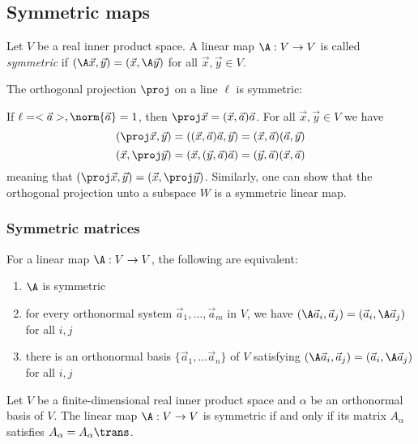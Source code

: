 \subsection{Symmetric maps}
\begin{definition}
    Let $V$ be a real inner product space. A linear map $\A: V \to V$ is called \emph{symmetric} if $(\A\vec{x},\vec{y}) = (\vec{x},\A\vec{y})$
    for all $\vec{x},\vec{y} \in V$.
\end{definition}
\begin{example}
    The orthogonal projection $\proj$ on a line $\ell$ is symmetric:

    If $\ell = <\vec{a}>, \norm{\vec{a}} = 1$, then $\proj\vec{x} = (\vec{x},\vec{a})\vec{a}$.
    For all $\vec{x},\vec{y} \in V$ we have
    $$(\proj\vec{x},\vec{y})=((\vec{x},\vec{a})\vec{a},\vec{y})=(\vec{x},\vec{a})(\vec{a},\vec{y})$$
    $$(\vec{x},\proj\vec{y})=(\vec{x},(\vec{y},\vec{a})\vec{a})=(\vec{y},\vec{a})(\vec{x},\vec{a})$$
    meaning that $(\proj\vec{x},\vec{y}) = (\vec{x},\proj\vec{y})$.
    Similarly, one can show that the orthogonal projection unto a subspace $W$ is a symmetric linear map.
\end{example}

\subsubsection{Symmetric matrices}
\begin{theorem}
    For a linear map $\A: V \to V$, the following are equivalent:
    \begin{enumerate}
        \item $\A$ is symmetric
        \item for every orthonormal system $\vec{a}_1, \dots, \vec{a}_m$ in $V$, we have $(\A\vec{a}_i, \vec{a}_j) = (\vec{a}_i,\A\vec{a}_j)$ for all $i,j$
        \item there is an orthonormal basis $\{\vec{a}_1, \dots \vec{a}_n\}$ of $V$ satisfying $(\A\vec{a}_i, \vec{a}_j) = (\vec{a}_i,\A\vec{a}_j)$ for all $i,j$
    \end{enumerate}
\end{theorem}

\begin{proposition}
    Let $V$ be a finite-dimensional real inner product space and $\alpha$ be an orthonormal basis of $V$. The linear
    map $\A: V \to V$ is symmetric if and only if its matrix $A_\alpha$ satisfies $A_\alpha = A_\alpha\trans$.
\end{proposition}

